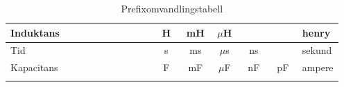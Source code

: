 \begin{longtable}{|l|c|c|c|c|c|c|c|c|c|c|c|l|c|c|c|c|c|c|c|c|c|c|c|c|l|}
	Induktans& \multicolumn{3}{c}{}\vline&\multicolumn{3}{c}{}\vline&\multicolumn{3}{c}{}\vline &\multicolumn{3}{c}{H}\vline&\multicolumn{3}{c}{mH}\vline &\multicolumn{3}{c}{\(\mu\)H}\vline&\multicolumn{3}{c}{}\vline&\multicolumn{3}{c}{ }\vline& henry\\ \hline
		Tid & \multicolumn{3}{c}{}\vline&\multicolumn{3}{c}{}\vline&\multicolumn{3}{c}{}\vline &\multicolumn{3}{c}{s}\vline&\multicolumn{3}{c}{ms}\vline &\multicolumn{3}{c}{\(\mu\)s}\vline&\multicolumn{3}{c}{ns}\vline&\multicolumn{3}{c}{ }\vline& sekund\\ \hline
		Kapacitans& \multicolumn{3}{c}{}\vline&\multicolumn{3}{c}{}\vline&\multicolumn{3}{c}{}\vline &\multicolumn{3}{c}{F}\vline&\multicolumn{3}{c}{mF}\vline &\multicolumn{3}{c}{\(\mu\)F}\vline&\multicolumn{3}{c}{nF}\vline&\multicolumn{3}{c}{pF}\vline& ampere\\ \hline
	\caption{Prefixomvandlingstabell}
	\label{Prefixomvandlingstabell} 
\end{longtable}
